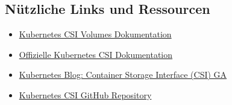 \subsection{Nützliche Links und Ressourcen}
\begin{itemize}
    \item \href{https://kubernetes.io/docs/concepts/storage/volumes/#csi}{Kubernetes CSI Volumes Dokumentation}
    \item \href{https://kubernetes-csi.github.io/docs/}{Offizielle Kubernetes CSI Dokumentation}
    \item \href{https://kubernetes.io/blog/2019/01/15/container-storage-interface-ga/}{Kubernetes Blog: Container Storage Interface (CSI) GA}
    \item \href{https://github.com/kubernetes-csi}{Kubernetes CSI GitHub Repository}
\end{itemize}
